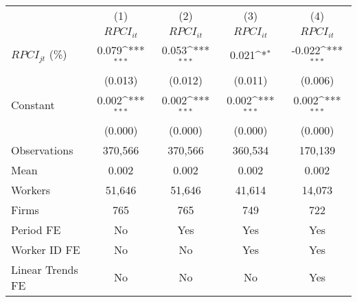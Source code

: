 {
\def\sym#1{\ifmmode^{#1}\else\(^{#1}\)\fi}
\begin{tabular}{l*{4}{c}}
\hline\hline
                    &\multicolumn{1}{c}{(1)}&\multicolumn{1}{c}{(2)}&\multicolumn{1}{c}{(3)}&\multicolumn{1}{c}{(4)}\\
                    &\multicolumn{1}{c}{$RPCI_{it}$}&\multicolumn{1}{c}{$RPCI_{it}$}&\multicolumn{1}{c}{$RPCI_{it}$}&\multicolumn{1}{c}{$RPCI_{it}$}\\
\hline
$RPCI_{jt}$ (\%)    &       0.079\sym{***}&       0.053\sym{***}&       0.021\sym{*}  &      -0.022\sym{***}\\
                    &     (0.013)         &     (0.012)         &     (0.011)         &     (0.006)         \\
[1em]
Constant            &       0.002\sym{***}&       0.002\sym{***}&       0.002\sym{***}&       0.002\sym{***}\\
                    &     (0.000)         &     (0.000)         &     (0.000)         &     (0.000)         \\
\hline
Observations        &     370,566         &     370,566         &     360,534         &     170,139         \\
Mean                &       0.002         &       0.002         &       0.002         &       0.002         \\
Workers             &      51,646         &      51,646         &      41,614         &      14,073         \\
Firms               &         765         &         765         &         749         &         722         \\
Period FE           &          No         &         Yes         &         Yes         &         Yes         \\
Worker ID FE        &          No         &          No         &         Yes         &         Yes         \\
Linear Trends FE    &          No         &          No         &          No         &         Yes         \\
\hline\hline
\end{tabular}
}
